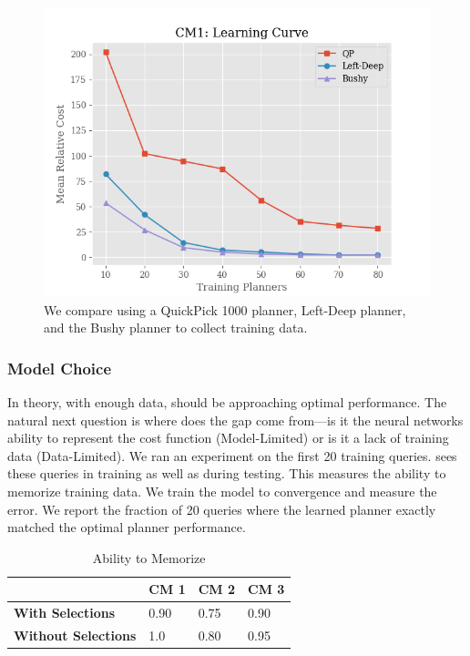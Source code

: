 \begin{figure}
    \centering
    \includegraphics[width=0.8\columnwidth]{exp/exp2_plot3.png}
    \caption{
    \small{
    We compare using a QuickPick 1000 planner, Left-Deep planner, and the Bushy planner to collect training data.
    }\label{exp:plot4}}
\end{figure}


\subsubsection{Model Choice}
In theory, with enough data, \sys should be approaching optimal performance.
The natural next question is where does the gap come from---is it the neural networks ability to represent the cost function (Model-Limited) or is it a lack of training data (Data-Limited).
We ran an experiment on the first 20 training queries. \sys sees these queries in training as well as during testing. This measures the ability to memorize training data. We train the model to convergence and measure the error. We report the fraction of 20 queries where the learned planner exactly matched the optimal planner performance.

\begin{table}[ht!]\centering \small
\caption{\small{Ability to Memorize}}\vspace{0.25em}
\begin{tabular}{|l|l|l|l|}\hline
    & {\bf CM 1}  & {\bf CM 2}  & {\bf CM 3} \\ \hline
{\bf With Selections}  & 0.90  & 0.75   & 0.90 \\ \hline
{\bf Without Selections}  & 1.0  & 0.80   &  0.95\\ \hline
\end{tabular}
\end{table}

